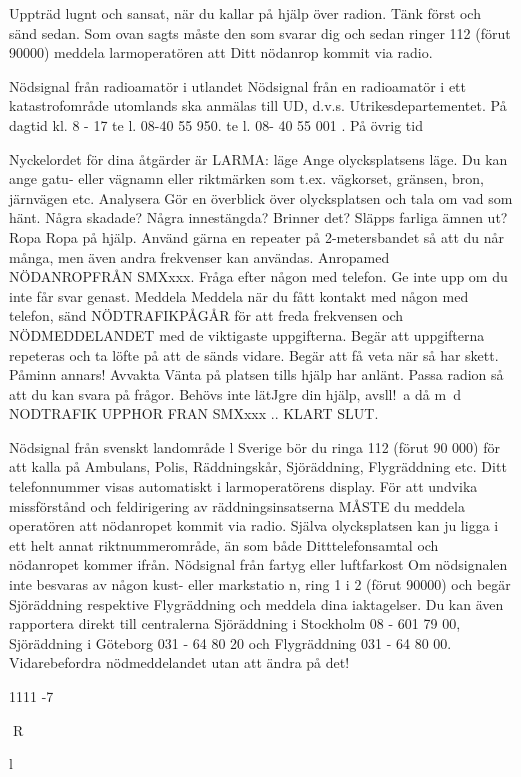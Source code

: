\documentclass[a4paper,twoside,twocolumn,openright]{book}
\begin{document}
{{{{{Uppträd lugnt och sansat, när du kallar på
hjälp över radion. Tänk först och sänd sedan. Som ovan sagts måste den som svarar
dig och sedan ringer 112 (förut 90000) meddela larmoperatören att Ditt nödanrop kommit via radio.

Nödsignal från radioamatör i utlandet
Nödsignal från en radioamatör i ett katastrofområde utomlands ska anmälas till UD, d.v.s.
Utrikesdepartementet.
På dagtid kl. 8 - 17
te l. 08-40 55 950.
te l. 08- 40 55 001 .
På övrig tid

Nyckelordet för dina åtgärder är LARMA:
läge
Ange olycksplatsens läge. Du kan
ange gatu- eller vägnamn eller
riktmärken som t.ex. vägkorset,
gränsen, bron, järnvägen etc.
Analysera Gör en överblick över olycksplatsen och tala om vad som hänt.
Några skadade? Några innestängda? Brinner det? Släpps
farliga ämnen ut?
Ropa
Ropa på hjälp. Använd gärna en
repeater på 2-metersbandet så
att du når många, men även andra frekvenser kan användas.
Anropamed NÖDANROPFRÅN
SMXxxx. Fråga efter någon med
telefon. Ge inte upp om du inte får
svar genast.
Meddela Meddela när du fått kontakt med
någon med telefon, sänd NÖDTRAFIKPÅGÅR för att freda frekvensen och NÖDMEDDELANDET med de viktigaste uppgifterna. Begär att uppgifterna repeteras och ta löfte på att de sänds
vidare. Begär att få veta när så
har skett. Påminn annars!
Avvakta Vänta på platsen tills hjälp har
anlänt. Passa radion så att du
kan svara på frågor. Behövs inte
lätJgre din hjälp, avsll!~a då m~d
NODTRAFIK UPPHOR FRAN
SMXxxx .. KLART SLUT.

Nödsignal från svenskt landområde
l Sverige bör du ringa 112 (förut 90 000) för
att kalla på Ambulans, Polis, Räddningskår,
Sjöräddning, Flygräddning etc. Ditt telefonnummer visas automatiskt i larmoperatörens display.
För att undvika missförstånd och feldirigering av räddningsinsatserna MÅSTE
du meddela operatören att nödanropet kommit via radio. Själva olycksplatsen kan ju
ligga i ett helt annat riktnummerområde, än
som både Ditttelefonsamtal och nödanropet
kommer ifrån.
Nödsignal från fartyg eller luftfarkost
Om nödsignalen inte besvaras av någon
kust- eller markstatio n, ring 1 i 2 (förut 90000)
och begär Sjöräddning respektive Flygräddning och meddela dina iaktagelser. Du
kan även rapportera direkt till centralerna
Sjöräddning i Stockholm 08 - 601 79 00,
Sjöräddning i Göteborg 031 - 64 80 20 och
Flygräddning 031 - 64 80 00.
Vidarebefordra nödmeddelandet utan att
ändra på det!

1111 -7

R

l

}}}}}
\end{document}

